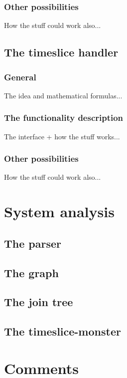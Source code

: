 \documentclass[12pt,a4paper]{report}
\begin{document}
\subsection{Other possibilities}

How the stuff could work also...


\newpage
\section{The timeslice handler} %
\subsection{General}

The idea and mathematical formulas...

\subsection{The functionality description}

The interface + how the stuff works...

\subsection{Other possibilities}

How the stuff could work also...



\newpage
\chapter{System analysis}
\section{The parser}

\section{The graph}

\section{The join tree}

\section{The timeslice-monster}


\newpage
\chapter{Comments}


\newpage

\end{document}
